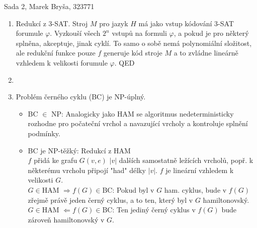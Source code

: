 \documentclass[a4wide,12pt]{extarticle}
\begin{document}
\begin{flushleft}
Sada 2, Marek Bryša, 323771
\end{flushleft}
\begin{enumerate}
  \item
		Redukcí z 3-SAT. Stroj $M$ pro jazyk $H$ má jako vstup kódování 3-SAT forumule $\varphi$. Vyzkouší všech $2^n$ vstupů na formuli $\varphi$, a pokud je pro některý splněna, akceptuje, jinak cyklí. To samo o sobě nemá polynomiální složitost, ale redukční funkce pouze $f$ generuje kód stroje $M$ a to zvládne lineárně vzhledem k velikosti forumule $\varphi$. QED
	\item
	\item
		Problém černého cyklu (BC) je NP-úplný.
		\begin{itemize}
			\item BC $\in$ NP: Analogicky jako HAM se algoritmus nedeterministicky rozhodne pro počateční vrchol a navazující vrcholy a kontroluje splnění podmínky.
			\item
				BC je NP-těžký: Redukcí z HAM\\
				$f$ přidá ke grafu $G(v,e)$ $|v|$ dalších samostatně ležících vrcholů, popř. k některému vrcholu připojí "had" délky $|v|$. $f$ je lineární vzhledem k velikosti $G$.\\
				$G\in$HAM $\Rightarrow f(G)\in$BC: Pokud byl v $G$ ham. cyklus, bude v $f(G)$ zřejmě právě jeden černý cyklus, a to ten, který byl v $G$ hamiltonovský.\\
				$G\in$HAM $\Leftarrow f(G)\in$BC: Ten jediný černý cyklus v $f(G)$ bude zároveň hamiltonovský v $G$.
				

\end{itemize}
\end{enumerate}
\end{document}
